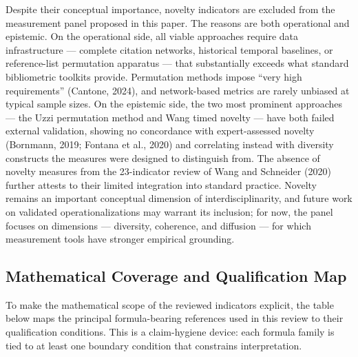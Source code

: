 \documentclass[
]{article}
\begin{document}
Despite their conceptual importance, novelty indicators are excluded
from the measurement panel proposed in this paper. The reasons are both
operational and epistemic. On the operational side, all viable
approaches require data infrastructure --- complete citation networks,
historical temporal baselines, or reference-list permutation apparatus
--- that substantially exceeds what standard bibliometric toolkits
provide. Permutation methods impose ``very high requirements'' (Cantone,
2024), and network-based metrics are rarely unbiased at typical sample
sizes. On the epistemic side, the two most prominent approaches --- the
Uzzi permutation method and Wang timed novelty --- have both failed
external validation, showing no concordance with expert-assessed novelty
(Bornmann, 2019; Fontana et al., 2020) and correlating instead with
diversity constructs the measures were designed to distinguish from. The
absence of novelty measures from the 23-indicator review of Wang and
Schneider (2020) further attests to their limited integration into
standard practice. Novelty remains an important conceptual dimension of
interdisciplinarity, and future work on validated operationalizations
may warrant its inclusion; for now, the panel focuses on dimensions ---
diversity, coherence, and diffusion --- for which measurement tools have
stronger empirical grounding.

\hypertarget{mathematical-coverage-and-qualification-map}{%
\subsection{Mathematical Coverage and Qualification
Map}\label{mathematical-coverage-and-qualification-map}}

To make the mathematical scope of the reviewed indicators explicit, the
table below maps the principal formula-bearing references used in this
review to their qualification conditions. This is a claim-hygiene
device: each formula family is tied to at least one boundary condition
that constrains interpretation.
\end{document}
